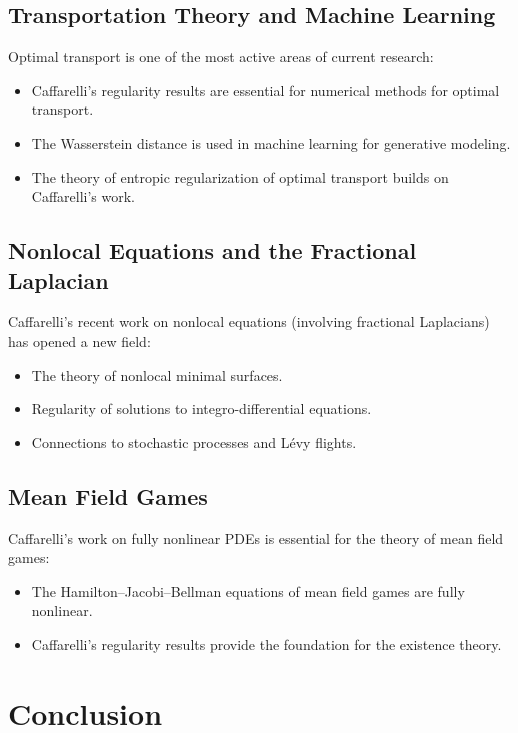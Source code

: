 \subsection{Transportation Theory and Machine Learning}

Optimal transport is one of the most active areas of current research:
\begin{itemize}
\item Caffarelli's regularity results are essential for numerical methods for optimal transport.
\item The Wasserstein distance is used in machine learning for generative modeling.
\item The theory of entropic regularization of optimal transport builds on Caffarelli's work.
\end{itemize}

\subsection{Nonlocal Equations and the Fractional Laplacian}

Caffarelli's recent work on nonlocal equations (involving fractional Laplacians) has opened a new field:
\begin{itemize}
\item The theory of nonlocal minimal surfaces.
\item Regularity of solutions to integro-differential equations.
\item Connections to stochastic processes and L\'evy flights.
\end{itemize}

\subsection{Mean Field Games}

Caffarelli's work on fully nonlinear PDEs is essential for the theory of mean field games:
\begin{itemize}
\item The Hamilton--Jacobi--Bellman equations of mean field games are fully nonlinear.
\item Caffarelli's regularity results provide the foundation for the existence theory.
\end{itemize}

\section{Conclusion}

